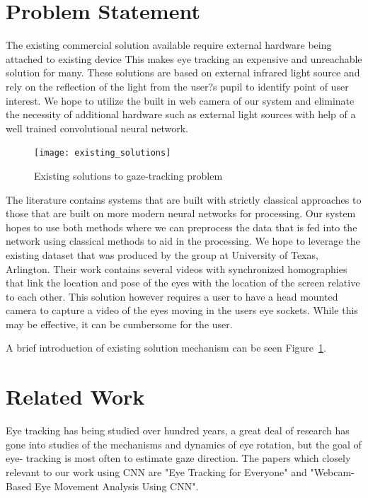 \documentclass[10pt,twocolumn,letterpaper]{article}
\begin{document}
\section{Problem Statement}
The existing commercial solution available require external hardware
being attached to existing device\cite{eyetrackerlist}\cite{tobii_1} This makes eye tracking an
expensive and unreachable solution for many. These solutions are based
on external infrared light source and rely on the reflection of the
light from the user?s pupil to identify point of user interest. We hope to
utilize the built in web camera of our system and eliminate the necessity
of additional hardware such as external light sources with help of a
well trained convolutional neural network.


\begin{figure}
  \begin{center}
    \texttt{[image: existing\_solutions]}
  \end{center}
  \caption{Existing solutions to gaze-tracking problem}
  \label{fig:existsol}
  \end{figure}

The literature contains systems that are built with strictly classical
approaches to those that are built on more modern neural networks for
processing\cite{krafka}\cite{mcmurrough}\cite{weidenbacher}\cite{baluja}\cite{cazzato}\cite{li}. Our
system hopes to use both methods where we can preprocess the data that
is fed into the network using classical methods to aid in the
processing. We hope to leverage the existing dataset that was produced
by the group at University of Texas, Arlington\cite{mcmurrough}. Their
work contains several videos with synchronized homographies that link
the location and pose of the eyes with the location of the screen
relative to each other. This solution however requires a user to have
a head mounted camera to capture a video of the eyes moving in the
users eye sockets. While this may be effective, it can be cumbersome
for the user.




A brief introduction of existing solution mechanism can be seen Figure~\ref{fig:existsol}.
\section{Related Work}
Eye tracking has being studied over hundred years, a great deal of research has gone into studies of the mechanisms and dynamics of eye rotation, but the goal of eye- tracking is most often to estimate gaze direction.  The papers which closely relevant to our work using CNN are "Eye Tracking for Everyone"\cite{krafka} and "Webcam-Based Eye Movement Analysis Using CNN"\cite{zhaomeng}.
\end{document}
